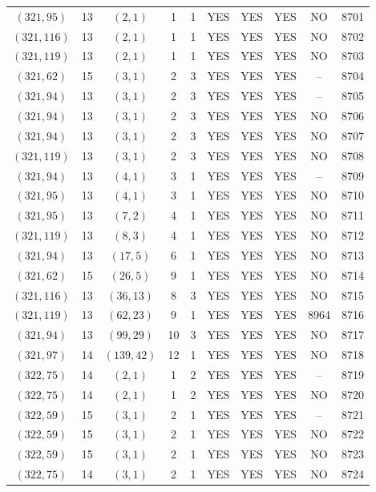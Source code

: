 \begin{longtable}{|c|c|c|c|c|c|c|c|c|c|}
$(321, 95)$ & 13 & $(2, 1)$ & 1 & 1 & YES & YES & YES & NO & 8701\\
$(321, 116)$ & 13 & $(2, 1)$ & 1 & 1 & YES & YES & YES & NO & 8702\\
$(321, 119)$ & 13 & $(2, 1)$ & 1 & 1 & YES & YES & YES & NO & 8703\\
$(321, 62)$ & 15 & $(3, 1)$ & 2 & 3 & YES & YES & YES & -- & 8704\\
$(321, 94)$ & 13 & $(3, 1)$ & 2 & 3 & YES & YES & YES & -- & 8705\\
$(321, 94)$ & 13 & $(3, 1)$ & 2 & 3 & YES & YES & YES & NO & 8706\\
$(321, 94)$ & 13 & $(3, 1)$ & 2 & 3 & YES & YES & YES & NO & 8707\\
$(321, 119)$ & 13 & $(3, 1)$ & 2 & 3 & YES & YES & YES & NO & 8708\\
$(321, 94)$ & 13 & $(4, 1)$ & 3 & 1 & YES & YES & YES & -- & 8709\\
$(321, 95)$ & 13 & $(4, 1)$ & 3 & 1 & YES & YES & YES & NO & 8710\\
$(321, 95)$ & 13 & $(7, 2)$ & 4 & 1 & YES & YES & YES & NO & 8711\\
$(321, 119)$ & 13 & $(8, 3)$ & 4 & 1 & YES & YES & YES & NO & 8712\\
$(321, 94)$ & 13 & $(17, 5)$ & 6 & 1 & YES & YES & YES & NO & 8713\\
$(321, 62)$ & 15 & $(26, 5)$ & 9 & 1 & YES & YES & YES & NO & 8714\\
$(321, 116)$ & 13 & $(36, 13)$ & 8 & 3 & YES & YES & YES & NO & 8715\\
$(321, 119)$ & 13 & $(62, 23)$ & 9 & 1 & YES & YES & YES & 8964 & 8716\\
$(321, 94)$ & 13 & $(99, 29)$ & 10 & 3 & YES & YES & YES & NO & 8717\\
$(321, 97)$ & 14 & $(139, 42)$ & 12 & 1 & YES & YES & YES & NO & 8718\\
$(322, 75)$ & 14 & $(2, 1)$ & 1 & 2 & YES & YES & YES & -- & 8719\\
$(322, 75)$ & 14 & $(2, 1)$ & 1 & 2 & YES & YES & YES & NO & 8720\\
$(322, 59)$ & 15 & $(3, 1)$ & 2 & 1 & YES & YES & YES & -- & 8721\\
$(322, 59)$ & 15 & $(3, 1)$ & 2 & 1 & YES & YES & YES & NO & 8722\\
$(322, 59)$ & 15 & $(3, 1)$ & 2 & 1 & YES & YES & YES & NO & 8723\\
$(322, 75)$ & 14 & $(3, 1)$ & 2 & 1 & YES & YES & YES & NO & 8724\\

\end{longtable}
